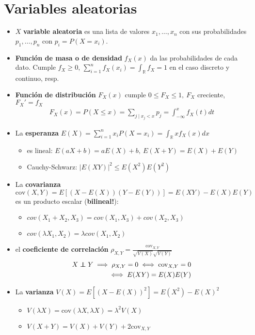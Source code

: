 \documentclass[a4paper,twocolumn]{extarticle}
\theoremstyle{remark}
\newcommand\indep{\protect\mathpalette{\protect\independenT}{\perp}}
\def\independenT#1#2{\mathrel{\rlap{$#1#2$}\mkern2mu{#1#2}}}
\newcommand{\R}{\mathbb{R}}
\newcommand{\cov}{\text{cov}}
\begin{document}
\section{Variables aleatorias}

\begin{itemize}
	\item $X$ \textbf{variable aleatoria} es una lista de valores $x_1,\dots,x_n$ con sus probabilidades $p_1,\dots, p_n$ con $p_i = P(X = x_i)$.
	\item \textbf{Función de masa o de densidad} $f_X(x)$ da las probabilidades de cada dato. Cumple $f_X \geq 0$, $\sum_{i=1}^n f_X(x_i) = \int_\R f_X = 1$ en el caso discreto y continuo, resp.
	\item \textbf{Función de distribución} $F_X(x)$ cumple $0 \leq F_X \leq 1,\ F_X$ creciente, $F_X' = f_X$
	\begin{align*}
		F_X(x)= P(X \leq x) = \sum_{j\mid x_j < x} p_j = \int_{-\infty}^{x}f_X(t)dt
	\end{align*} 
	\item La \textbf{esperanza} $E(X) = \sum_{i=1}^n x_i P(X = x_i) = \int_\R xf_X(x)dx$
	\begin{itemize}
		\item es lineal: $E(aX + b) = a E(X) + b,\ E(X + Y) = E(X) + E(Y)$
		\item Cauchy-Schwarz: $|E(XY)|^2 \leq E(X^2)E(Y^2)$
	\end{itemize}
	\item La \textbf{covarianza} $\cov(X,Y) = E[(X - E(X))(Y - E(Y))] = E(XY) - E(X)E(Y)$ es un producto escalar (\textbf{bilineal!}):
	\begin{itemize}
		\item $cov(X_1 + X_2, X_3) = cov(X_1, X_3) + cov(X_2, X_3)$
		\item $cov(\lambda X_1, X_2) = \lambda cov(X_1, X_2)$
	\end{itemize}
	\item el \textbf{coeficiente de correlación} $\rho_{X,Y} = \frac{\cov_{X,Y}}{\sqrt{V(X)}\sqrt{V(Y)}}$
	\begin{align*}
	X\indep Y \implies \rho_{X,Y} = 0 \iff \cov_{X,Y} = 0\\ \iff E(XY) = E(X)E(Y)
	\end{align*}
	\item La \textbf{varianza} $V(X) = E[(X - E(X))^2] = E(X^2) - E(X)^2$
	\begin{itemize}
		\item $V(\lambda X) = \cov(\lambda X, \lambda X) = \lambda^2 V(X)$
		\item $V(X + Y) = V(X) + V(Y) + 2\text{cov}_{X,Y}$
	\end{itemize}
	
\end{itemize}
\end{document}
